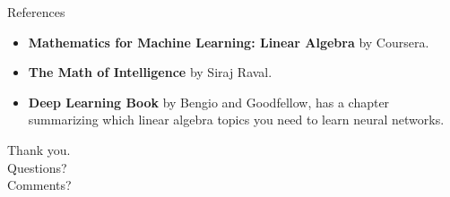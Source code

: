 \documentclass[handout]{beamer}
\begin{document}
\begin{frame}{References}
    \begin{itemize}
        \item \textbf{Mathematics for Machine Learning: Linear Algebra} by Coursera.
        \item \textbf{The Math of Intelligence} by Siraj Raval.
        \item \textbf{Deep Learning Book} by Bengio and Goodfellow, has a chapter summarizing
            which linear algebra topics you need to learn neural networks.
    \end{itemize}
\end{frame}

\begin{frame}
\huge{Thank you.}\\
\huge{Questions?}\\
\huge{Comments?}\\
\end{frame}
\end{document}
